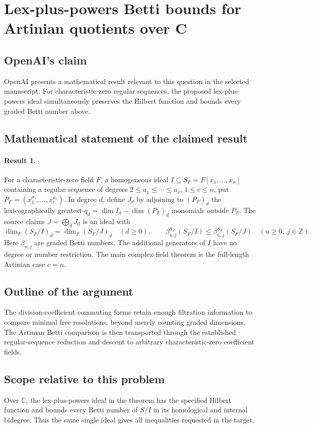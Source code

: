 \documentclass[11pt]{article}
\begin{document}
\section*{Lex-plus-powers Betti bounds for Artinian quotients over C}

\subsection{OpenAI's claim}
OpenAI presents a mathematical result relevant to this question in the selected manuscript. For characteristic-zero regular sequences, the proposed lex-plus-powers ideal simultaneously preserves the Hilbert function and bounds every graded Betti number above.

\subsection{Mathematical statement of the claimed result}
\paragraph{Result 1.} For a characteristic-zero field \(F\), a homogeneous ideal \(I\subseteq S_F=F[x_1,\ldots,x_n]\) containing a regular sequence of degrees \(2\le a_1\le\cdots\le a_c\), \(1\le c\le n\), put \(P_F=(x_1^{a_1},\ldots,x_c^{a_c})\). In degree \(d\), define \(J_d\) by adjoining to \((P_F)_d\) the lexicographically greatest \(q_d=\dim I_d-\dim(P_F)_d\) monomials outside \(P_F\). The source claims \(J=\bigoplus_dJ_d\) is an ideal with
\[
 \dim_F(S_F/I)_d=\dim_F(S_F/J)_d\quad(d\ge0),\qquad
 \beta^{S_F}_{u,j}(S_F/I)\le\beta^{S_F}_{u,j}(S_F/J)
 \quad(u\ge0,\ j\in\mathbb Z).
\]
Here \(\beta_{u,j}\) are graded Betti numbers. The additional generators of \(I\) have no degree or number restriction. The main complex-field theorem is the full-length Artinian case \(c=n\).

\subsection{Outline of the argument}
The division-coefficient commuting forms retain enough filtration information to compare minimal free resolutions, beyond merely counting graded dimensions. The Artinian Betti comparison is then transported through the established regular-sequence reduction and descent to arbitrary characteristic-zero coefficient fields.

\subsection{Scope relative to this problem}
Over $\mathbb C$, the lex-plus-powers ideal in the theorem has the specified Hilbert function and bounds every Betti number of $S/I$ in its homological and internal bidegree. Thus the same single ideal gives all inequalities requested in the target.
\end{document}
